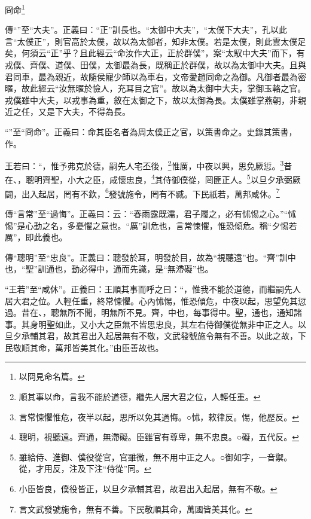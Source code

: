 冏命\footnote{以冏見命名篇。}


{\noindent\zhuan{}\fzbyks 傳“”至“大夫”。正義曰：“正”訓長也。“太御中大夫”，“太僕下大夫”，孔以此言“太僕正”，則官高於太僕，故以為太御者，知非太僕。若是太僕，則此雲太僕足矣，何須云“正”乎？且此經云“命汝作大正，正於群僕”，案“太馭中大夫”而下，有戎僕、齊僕、道僕、田僕，太御最為長，既稱正於群僕，故以為太御中大夫。且與君同車，最為親近，故隨侯寵少師以為車右，文帝愛趙同命之為御。凡御者最為密暱，故此經云“汝無暱於憸人，充耳目之官”。故以為太御中大夫，掌御玉輅之官。戎僕雖中大夫，以戎事為重，敘在太御之下，故以太御為長。太僕雖掌燕朝，非親近之任，又是下大夫，不得為長。 \par}

{\noindent\shu{}\fzkt “”至“冏命”。正義曰：命其臣名者為周太僕正之官，以策書命之。史錄其策書，作。 \par}

王若曰：“，惟予弗克於德，嗣先人宅丕後，\footnote{順其事以命，言我不能於道德，繼先人居大君之位，人輕任重。}惟厲，中夜以興，思免厥愆。\footnote{言常悚懼惟危，夜半以起，思所以免其過悔。○怵，敕律反。惕，他歷反。}昔在、，聰明齊聖，小大之臣，咸懷忠良，\footnote{聰明，視聽遠。齊通，無滯礙。臣雖官有尊卑，無不忠良。○礙，五代反。}其侍御僕從，罔匪正人。\footnote{雖給侍、進御、僕役從官，官雖微，無不用中正之人。○御如字，一音禦。從，才用反，注及下注“侍從”同。}以旦夕承弼厥闢，出入起居，罔有不欽，\footnote{小臣皆良，僕役皆正，以旦夕承輔其君，故君出入起居，無有不敬。}發號施令，罔有不臧。下民祇若，萬邦咸休。\footnote{言文武發號施令，無有不善。下民敬順其命，萬國皆美其化。}


{\noindent\zhuan{}\fzbyks 傳“言常”至“過悔”。正義曰：云：“春雨露既濡，君子履之，必有怵惕之心。”“怵惕”是心動之名，多憂懼之意也。“厲”訓危也，言常悚懼，惟恐傾危。稱“夕惕若厲”，即此義也。 \par}

{\noindent\zhuan{}\fzbyks 傳“聰明”至“忠良”。正義曰：聰發於耳，明發於目，故為“視聽遠”也。“齊”訓中也，“聖”訓通也，動必得中，通而先識，是“無滯礙”也。 \par}

{\noindent\shu{}\fzkt “王若”至“咸休”。正義曰：王順其事而呼之曰：“，惟我不能於道德，而繼嗣先人居大君之位。人輕任重，終常悚懼。心內怵惕，惟恐傾危，中夜以起，思望免其愆過。昔在、，聰無所不聞，明無所不見。齊，中也，每事得中。聖，通也，通知諸事。其身明聖如此，又小大之臣無不皆思忠良，其左右侍御僕從無非中正之人。以旦夕承輔其君，故其君出入起居無有不敬，文武發號施令無有不善。以此之故，下民敬順其命，萬邦皆美其化。”由臣善故也。 \par}

